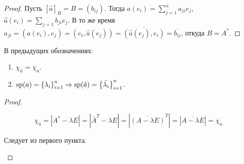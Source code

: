 \begin{proof}
    Пусть $[\hat{a}]_B = B = (b_{ij})$. Тогда $a(e_i) = \sum_{j=1}^{n} a_{ji} e_j$, $\hat{a}(e_i) = \sum_{j=1} b_{ji} e_j$. В то же время $a_{ji} = (a(e_i), e_j) = (e_i, \hat{a}(e_j)) = \overline{(\hat{a}(e_j), e_i)} = \overline{b_{ij}}$, откуда $B = A^*$.
\end{proof}

\begin{cor*}
    В предыдущих обозначениях:
    \begin{enumerate}
        \item $\chi_{\hat{a}} = \overline{\chi_a}$.
        \item $\operatorname{sp}(a) = \left\{\lambda_i\right\}_{i=1}^{n} \Rightarrow \operatorname{sp}(\hat{a}) = \left\{\bar{\lambda_i}\right\}_{i=1}^{n}$.
    \end{enumerate}
\end{cor*}

\begin{proof}
    \begin{proofpart}
        $$\chi_{\hat{a}} = |A^* - \lambda E| = |\bar{A}^T - \lambda E| = |\overline{(A - \lambda E)}^T| = |\overline{A - \lambda E}| = \overline{\chi_a}$$
    \end{proofpart}

    \begin{proofpart}
        Следует из первого пункта.
    \end{proofpart}
\end{proof}